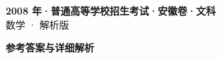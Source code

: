 \documentclass[zihao=-4, a4paper]{ctexart}
\begin{document}
\begin{center}
  {\Large\bfseries 2008 年·普通高等学校招生考试·安徽卷·文科}\\[4pt]
  {\large 数学 · 解析版}
\end{center}
\medskip
{}

\clearpage
{}
\begin{center}{\Large\bfseries 参考答案与详细解析}\end{center}
\medskip

\end{document}
